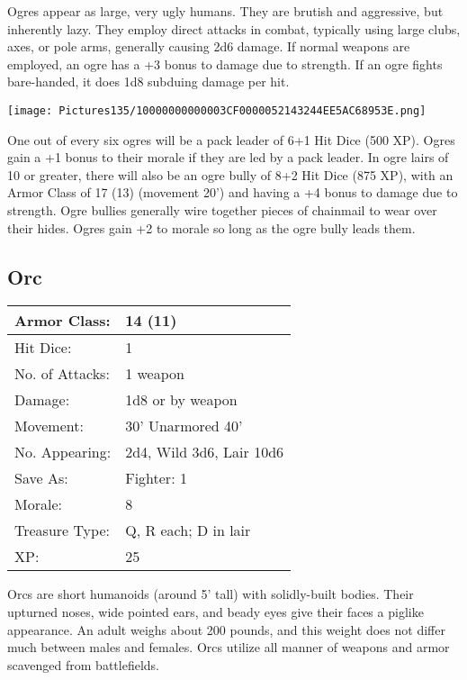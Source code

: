 \documentclass[a4paper,twoside,openany,10pt]{book}
\begin{document}
\begin{multicols}{2}
Ogres appear as large, very ugly humans. They are brutish and aggressive, but inherently lazy. They employ direct attacks in combat, typically using large clubs, axes, or pole arms, generally causing 2d6 damage. If normal weapons are employed, an ogre has a +3 bonus to damage due to strength. If an ogre fights bare-handed, it does 1d8 subduing damage per hit.

\begin{center} \texttt{[image: Pictures135/10000000000003CF0000052143244EE5AC68953E.png]} \end{center}

One out of every six ogres will be a pack leader of 6+1 Hit Dice (500 XP). Ogres gain a +1 bonus to their morale if they are led by a pack leader. In ogre lairs of 10 or greater, there will also be an ogre bully of 8+2 Hit Dice (875 XP), with an Armor Class of 17 (13) (movement 20') and having a +4 bonus to damage due to strength. Ogre bullies generally wire together pieces of chainmail to wear over their hides. Ogres gain +2 to morale so long as the ogre bully leads them.

\subsection*{Orc}\label{orc}

\begin{tabularx}{0.50\textwidth}{@{}lX@{}}
Armor Class: & 14 (11) \\\hline
Hit Dice: & 1 \\\hline
No. of Attacks: & 1 weapon \\\hline
Damage: & 1d8 or by weapon \\\hline
Movement: & 30' Unarmored 40' \\\hline
No. Appearing: & 2d4, Wild 3d6, Lair 10d6 \\\hline
Save As: & Fighter: 1 \\\hline
Morale: & 8 \\\hline
Treasure Type: & Q, R each; D in lair \\\hline
XP: & 25 \\\hline
\end{tabularx}\medskip

Orcs are short humanoids (around 5' tall) with solidly-built bodies. Their upturned noses, wide pointed ears, and beady eyes give their faces a piglike appearance. An adult weighs about 200 pounds, and this weight does not differ much between males and females. Orcs utilize all manner of weapons and armor scavenged from battlefields.



\end{multicols}
\end{document}
